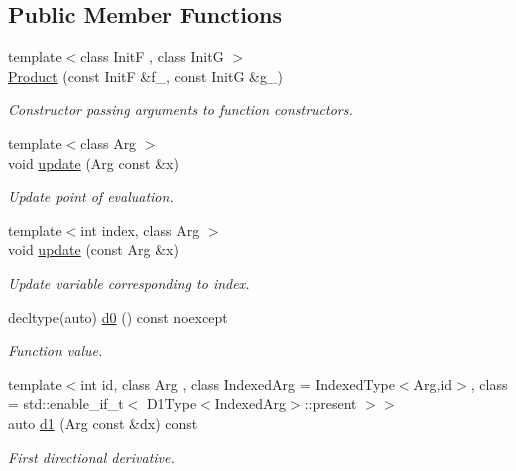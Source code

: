 \subsection*{Public Member Functions}
\begin{DoxyCompactItemize}
\item 
{\footnotesize template$<$class Init\+F , class Init\+G $>$ }\\\hyperlink{structFunG_1_1MathematicalOperations_1_1Product_a98d62512443b8c9d31466998b0fa6ee8}{Product} (const Init\+F \&f\+\_\+, const Init\+G \&g\+\_\+)
\begin{DoxyCompactList}\small\item\em Constructor passing arguments to function constructors. \end{DoxyCompactList}\item 
{\footnotesize template$<$class Arg $>$ }\\void \hyperlink{structFunG_1_1MathematicalOperations_1_1Product_a5b45c1bac06651ee5b6ea79fb5128ef9}{update} (Arg const \&x)
\begin{DoxyCompactList}\small\item\em Update point of evaluation. \end{DoxyCompactList}\item 
{\footnotesize template$<$int index, class Arg $>$ }\\void \hyperlink{structFunG_1_1MathematicalOperations_1_1Product_a8db3d935bbe273c0436ff3bc6bb6b786}{update} (const Arg \&x)
\begin{DoxyCompactList}\small\item\em Update variable corresponding to index. \end{DoxyCompactList}\item 
decltype(auto) \hyperlink{structFunG_1_1MathematicalOperations_1_1Product_a2dcd0cd8b29911b24ee830b8aaa6441c}{d0} () const noexcept
\begin{DoxyCompactList}\small\item\em Function value. \end{DoxyCompactList}\item 
{\footnotesize template$<$int id, class Arg , class Indexed\+Arg  = Indexed\+Type$<$\+Arg,id$>$, class  = std\+::enable\+\_\+if\+\_\+t$<$ D1\+Type$<$\+Indexed\+Arg$>$\+::present $>$$>$ }\\auto \hyperlink{structFunG_1_1MathematicalOperations_1_1Product_aea69feaac16f79717a85d7b089a80f8f}{d1} (Arg const \&dx) const 
\begin{DoxyCompactList}\small\item\em First directional derivative. \end{DoxyCompactList}\item 

\end{DoxyCompactItemize}
